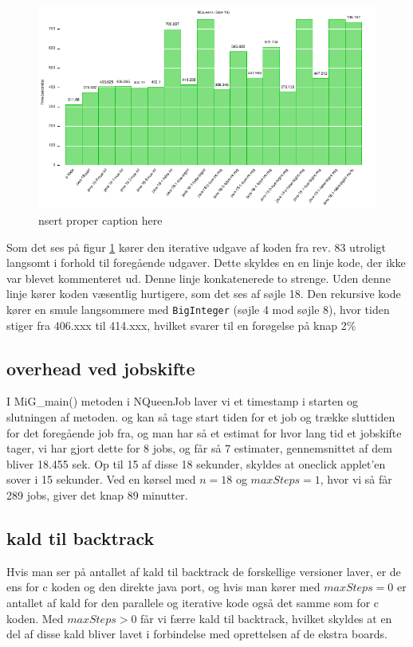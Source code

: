 \begin{figure}[h]
\begin{center}
\includegraphics{../benchmarks/b3.pdf}
\caption{nsert proper caption here } 
\label{plot:b3}
\end{center}
\end{figure}

Som det ses på figur \ref{plot:b3} kører den iterative udgave af koden fra
rev. 83 utroligt langsomt i forhold til foregående udgaver. 
Dette skyldes en en linje kode, der ikke var blevet kommenteret ud. Denne linje
konkatenerede to strenge. Uden denne linje kører koden væsentlig hurtigere, som
det ses af søjle 18. Den rekursive kode kører en smule langsommere med
\texttt{BigInteger} (søjle 4 mod søjle 8), hvor tiden stiger fra 406.xxx til
414.xxx, hvilket svarer til en forøgelse på knap 2\%

\subsection{overhead ved jobskifte}

I MiG\_main() metoden i NQueenJob laver vi et timestamp i starten og slutningen af metoden. 
og kan så tage start tiden for et job og trække sluttiden for det foregående job
fra, og man har så et estimat for hvor lang tid et jobskifte tager, vi har gjort
dette for 8 jobs, og får så 7 estimater, gennemsnittet af dem bliver 18.455 sek. 
Op til 15 af disse 18 sekunder, skyldes at oneclick applet'en sover i 15 sekunder. 
Ved en kørsel med $n=18$ og $maxSteps=1$, hvor vi så får 289 jobs, giver det
knap 89 minutter. 

\subsection{kald til backtrack}
Hvis man ser på antallet af kald til backtrack de forskellige versioner laver, er de
ens for c koden og den direkte java port, og hvis man kører med $maxSteps=0$ er
antallet af kald for den parallele og iterative kode også det samme som
for c koden. Med $maxSteps>0$ får vi færre kald til backtrack, hvilket skyldes
at en del af disse kald bliver lavet i forbindelse med oprettelsen af de ekstra
boards. 

